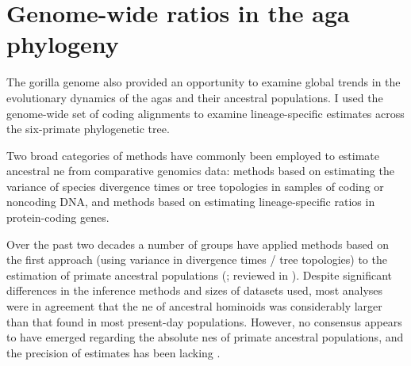 \section[Genome-wide \dnds ratios in the African great ape phylogeny]{Genome-wide \dnds ratios in the \acf{aga} phylogeny}

The gorilla genome also provided an opportunity to examine global
trends in the evolutionary dynamics of the \acp{aga} and
their ancestral populations. I used the genome-wide set of coding
alignments to examine lineage-specific \dnds estimates across the
six-primate phylogenetic tree.

Two broad categories of methods have commonly been employed to
estimate ancestral \ac{ne} from comparative genomics data: methods
based on estimating the variance of species divergence times or tree
topologies in samples of coding or noncoding DNA, and methods based on
estimating lineage-specific \dnds ratios in protein-coding genes.

Over the past two decades a number of groups have applied methods
based on the first approach (using variance in divergence times / tree
topologies) to the estimation of primate ancestral populations
(\citet{Takahata1997,Chen2001,Holbolth2007,Burgess2008}; reviewed in
\citet{Siepel2009a}). Despite significant differences in the inference
methods and sizes of datasets used, most analyses were in agreement
that the \ac{ne} of ancestral hominoids was considerably larger than
that found in most present-day populations. However, no consensus
appears to have emerged regarding the absolute \acp{ne} of primate
ancestral populations, and the precision of estimates has been lacking
\citep{Siepel2009a}.

